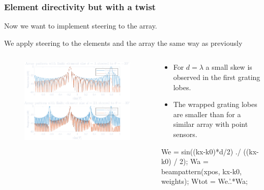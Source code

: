 \documentclass[compress]{beamer}
\begin{document}
\begin{frame}[fragile] %
    \frametitle{Element directivity but with a twist} 
    Now we want to implement steering to the array.

    We apply steering to the elements and the array the same way as previously
    \begin{columns}
        \begin{column}{0.5\textwidth}
            \begin{figure}
                \includegraphics[width=\columnwidth]{"../12.pdf"}
            \end{figure}
        \end{column}
        \begin{column}{0.52\textwidth}
            \begin{itemize}
                \item For $d=\lambda$ a small skew is observed in the first
                    grating lobes.
                \item The wrapped grating lobes are smaller than for a similar
                    array with point sensors.
            \end{itemize}
            \begin{jllisting}[gobble=16,language=Matlab]
                We = sin((kx-k0)*d/2) ./ ((kx-k0) / 2);
                Wa = beampattern(xpos, kx-k0, weights);
                Wtot = We.'.*Wa;
            \end{jllisting}
        \end{column}
    \end{columns}
\end{frame}
\end{document}
